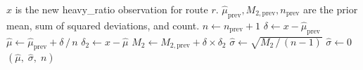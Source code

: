   \begin{algorithm}[H]                                                                                                                                    
      \small                                                                                                                                              
      \caption{$(\hat{\mu}, \hat{\sigma}, n) \gets                                                                                                        
      \texttt{WelfordUpdate}(x, \hat{\mu}_{\text{prev}}, M_{2,\text{prev}}, n_{\text{prev}})$}                                                            
      \label{alg:welford}                                                                                                                                 
      \begin{algorithmic}[1]                                                                                                                              
          \Require $x$ is the new heavy\_ratio observation for route $r$.                                                                                 
          \Require $\hat{\mu}_{\text{prev}}, M_{2,\text{prev}}, n_{\text{prev}}$                                                                          
          are the prior mean, sum of squared deviations, and count.                                                                                       
          \State $n \gets n_{\text{prev}} + 1$                                                                                                            
          \State $\delta \gets x - \hat{\mu}_{\text{prev}}$                                                                                               
          \State $\hat{\mu} \gets \hat{\mu}_{\text{prev}} + \delta \,/\, n$                                                                               
          \State $\delta_2 \gets x - \hat{\mu}$                                                                                                           
          \State $M_2 \gets M_{2,\text{prev}} + \delta \times \delta_2$                                                                                   
              \State $\hat{\sigma} \gets \sqrt{M_2 \,/\, (n - 1)}$                                                                                        
          \Else                                                                                                                                           
              \State $\hat{\sigma} \gets 0$                                                                                                               
          \EndIf                                                                                                                                          
          \State \Return $(\hat{\mu},\; \hat{\sigma},\; n)$
      \end{algorithmic}                                                                                                                                   
  \end{algorithm}

